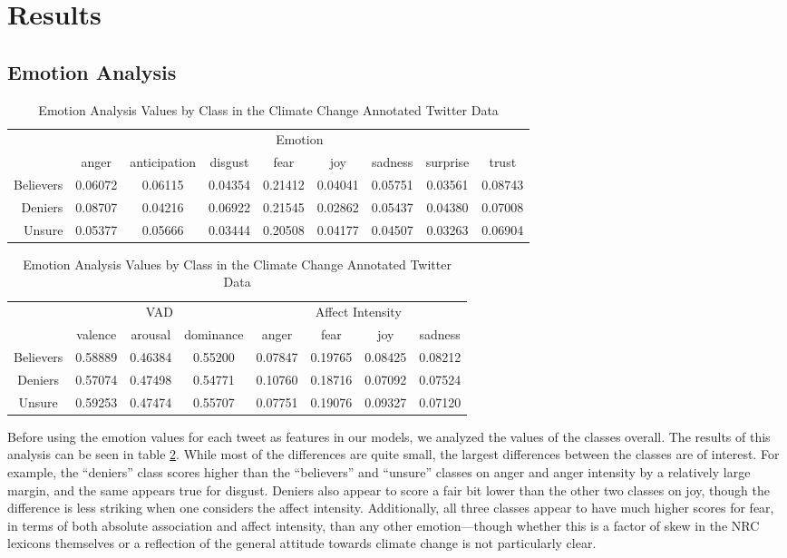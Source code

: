 \documentclass[article,oneside,a4paper,12pt]{memoir}
\begin{document}
\section{Results}

\subsection{Emotion Analysis}

\begin{table}[hbt]
    \centering
    \begin{tabular}{@{}rcccccccc@{}}
    \toprule
     & \multicolumn{8}{c}{Emotion} \\
     & anger & anticipation & disgust & fear & joy & sadness & surprise & trust  \\ \cmidrule(l){2-9} 
    Believers & 0.06072 & 0.06115 & 0.04354 & 0.21412 & 0.04041 & 0.05751 & 0.03561 & 0.08743 \\
    Deniers & 0.08707 & 0.04216 & 0.06922 & 0.21545 & 0.02862 & 0.05437 & 0.04380 & 0.07008 \\
    Unsure & 0.05377 & 0.05666 & 0.03444 & 0.20508 & 0.04177 & 0.04507 & 0.03263 & 0.06904 \\ \bottomrule
    \end{tabular}
    \bigskip
    \begin{tabular}{@{}cccc|cccc@{}}
        &  \multicolumn{3}{c|}{VAD} & \multicolumn{4}{c}{Affect Intensity} \\
        & valence & arousal & dominance & anger & fear & joy & sadness \\ \cmidrule(l){2-8}
        Believers & 0.58889 & 0.46384 & 0.55200 & 0.07847 & 0.19765 & 0.08425 & 0.08212 \\
        Deniers & 0.57074 & 0.47498 & 0.54771 & 0.10760 & 0.18716 & 0.07092 & 0.07524 \\
        Unsure & 0.59253 & 0.47474 & 0.55707 & 0.07751 & 0.19076 & 0.09327 & 0.07120 \\ \bottomrule
    \end{tabular}
    \caption{Emotion Analysis Values by Class in the Climate Change Annotated Twitter Data}
    \label{tab:emotion-analysis}
\end{table}

Before using the emotion values for each tweet as features in our models, we analyzed the values of the classes overall. The results of this analysis can be seen in table \ref{tab:emotion-analysis}. While most of the differences are quite small, the largest differences between the classes are of interest. For example, the ``deniers'' class scores higher than the ``believers'' and ``unsure'' classes on anger and anger intensity by a relatively large margin, and the same appears true for disgust. Deniers also appear to score a fair bit lower than the other two classes on joy, though the difference is less striking when one considers the affect intensity. Additionally, all three classes appear to have much higher scores for fear, in terms of both absolute association and affect intensity, than any other emotion---though whether this is a factor of skew in the NRC lexicons themselves or a reflection of the general attitude towards climate change is not particularly clear.
\end{document}
